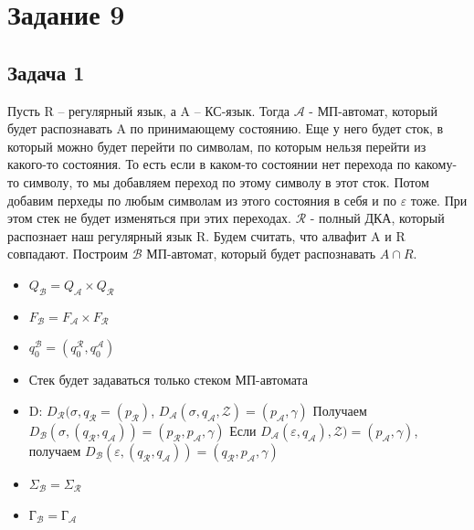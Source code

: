 \documentclass[a4paper,14pt]{article} %
\begin{document}

\section{Задание 9}
\subsection{Задача 1}
Пусть R -- регулярный язык, а A -- КС-язык. Тогда $\mathcal{A}$ - МП-автомат, который будет распознавать A по принимающему состоянию.
Еще у него будет сток, в который можно будет перейти по символам, по которым нельзя перейти из какого-то состояния. То есть если в каком-то состоянии нет перехода по какому-то символу, то мы добавляем переход по этому символу в этот сток.
Потом добавим перхеды по любым символам из этого состояния в себя и по $\varepsilon$ тоже. При этом стек не будет изменяться при этих переходах.
$\mathcal{R}$ - полный ДКА, который распознает наш регулярный язык R.
Будем считать, что алвафит A и R совпадают.
\newline
Построим $\mathcal{B}$ МП-автомат, который будет распознавать $A \cap R$.
\begin{itemize}
    \item $Q_{\mathcal{B}} = Q_{\mathcal{A}} \times Q_{\mathcal{R}}$
    \item $F_{\mathcal{B}} = F_{\mathcal{A}} \times F_{\mathcal{R}}$
    \item $q_{0}^{\mathcal{B}} = (q_{0}^{\mathcal{R}}, q_{0}^{\mathcal{A}})$
    \item Стек будет задаваться только стеком МП-автомата
    \item D: $D_{\mathcal{R}}(\sigma, q_{\mathcal{R}} = (p_{\mathcal{R}})$, $D_{\mathcal{A}}(\sigma, q_{\mathcal{A}}, \mathcal{Z}) = (p_{\mathcal{A}}, \gamma)$
    \newline Получаем $D_{\mathcal{B}}(\sigma, (q_{\mathcal{R}}, q_{\mathcal{A}})) = (p_{\mathcal{R}}, p_{\mathcal{A}}, \gamma)$
    \newline Если $D_{\mathcal{A}}(\varepsilon, q_{\mathcal{A}}), \mathcal{Z}) = (p_{\mathcal{A}}, \gamma)$, получаем 
    \newline $D_{\mathcal{B}}(\varepsilon, (q_{\mathcal{R}}, q_{\mathcal{A}})) = (q_{\mathcal{R}}, p_{\mathcal{A}}, \gamma) $
    \item $\Sigma_{\mathcal{B}} = \Sigma_{\mathcal{R}}$
    \item $\text{Г}_{\mathcal{B}} = \text{Г}_{\mathcal{A}}$
\end{itemize}
\end{document}
